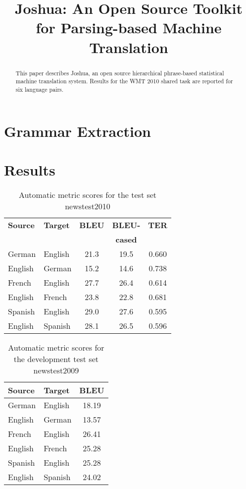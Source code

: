 \documentclass[11pt]{article}
\title{Joshua: An Open Source Toolkit for Parsing-based Machine Translation}
\date{}
\begin{document}
\maketitle

\begin{abstract}
 This paper describes Joshua, an open source hierarchical phrase-based statistical machine translation system. Results for the WMT 2010 shared task are reported for six language pairs.
\end{abstract}

\listoftodos

\section{Grammar Extraction}


\section{Results}


\begin{table}[h]
\begin{center}
\begin{tabular}{|l|l||c|c|c|}
\hline
\bf Source & \bf Target & \bf BLEU & \bf BLEU- & \bf TER \\
& & & \bf cased & \\
\hline
German & English & 21.3 & 19.5 & 0.660 \\ \hline
English & German & 15.2  & 14.6  & 0.738 \\ \hline
French & English & 27.7 & 26.4 & 0.614 \\ \hline
English & French & 23.8 & 22.8 & 0.681 \\ \hline
Spanish & English & 29.0 & 27.6 & 0.595 \\ \hline
English & Spanish & 28.1 & 26.5 & 0.596  \\ \hline
\end{tabular}
\end{center}
\caption{\label{scores} Automatic metric scores for the test set newstest2010 }
\end{table}


\begin{table}[h]
\begin{center}
\begin{tabular}{|l|l||c|}
\hline
\bf Source & \bf Target & \bf BLEU  \\
\hline
German & English & 18.19  \\ \hline
English & German & 13.57 \\ \hline
French & English & 26.41 \\ \hline
English & French & 25.28 \\ \hline
Spanish & English & 25.28 \\ \hline
English & Spanish & 24.02  \\ \hline
\end{tabular}
\end{center}
\caption{\label{devtest-scores} Automatic metric scores for the development test set newstest2009}
\end{table}
\end{document}
